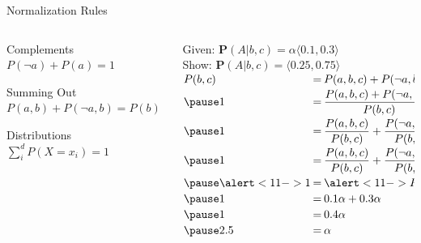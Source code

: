 \documentclass[14pt]{beamer}
\begin{document}
\begin{frame}{Normalization Rules}
	\begin{columns}
		\begin{column}{2in}
			\begin{block}{Complements}
				$P(\lnot a) + P(a) = 1$
			\end{block}
			\begin{block}{Summing Out}
				$P(a, b) + P(\lnot a, b) = P(b)$
			\end{block}
			\begin{block}{Distributions}
				$\sum\limits^{d}_{i}{P(X=x_{i})} = 1$
			\end{block}
		\end{column}
		\pause
		\begin{column}{2.4in}
			\small
			Given: $\mathbf{P}(A|b,c) = \alpha\langle 0.1, 0.3 \rangle$
			\\ \smallskip
			Show: $\mathbf{P}(A|b,c) = \langle 0.25, 0.75 \rangle$
			\\ \bigskip
			\pause
			$
			\begin{array}{@{}l@{\hspace{.2em}}l@{\hspace{.2em}}l@{}}
			P(b,c) & = & P(a,b,c) + P(\lnot a,b,c) \\[.2em]
			\pause
			1      & = & \displaystyle\frac{P(a,b,c) + P(\lnot a,b,c)}{P(b, c)} \\[.8em]
			\pause
			1      & = & \displaystyle\frac{P(a,b,c)}{P(b, c)} + \frac{P(\lnot a,b,c)}{P(b, c)} \\[.8em]
			\pause
			1      & = & \displaystyle\frac{P(a,b,c)}{P(b, c)} + \frac{P(\lnot a,b,c)}{P(b, c)} \\[.8em]
			\pause
			\alert<11->{1} & = & \alert<11->{P(a|b,c) + P(\lnot a|b,c)} \\[.2em]
			\pause
			1      & = & 0.1\alpha + 0.3\alpha \\[.2em]
			\pause
			1      & = & 0.4\alpha \\[.2em]
			\pause
			2.5    & = & \alpha
			\end{array}
			$
		\end{column}
	\end{columns}
\end{frame}
\end{document}
